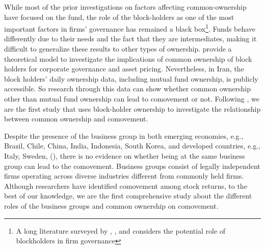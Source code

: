 While most of the prior investigations on factors affecting common-ownership have focused on the fund, the role of the block-holders as one of the most important factors in firms' governance has remained a black box\footnote{A long literature surveyed by \cite{holderness2003survey}, \cite{edmans2014blockholders}, and \cite{edmans2017blockholders} considers the potential role of blockholders in firm governance}. Funds behave differently due to their needs and the fact that they are intermediates, making it difficult to generalize these results to other types of ownership. \cite{edmans2014governance} provide a theoretical model to investigate the implications of common ownership of block holders for corporate governance and asset pricing. Nevertheless, in Iran, the block holders' daily ownership data, including mutual fund ownership, is publicly accessible. So research through this data can show whether common ownership other than mutual fund ownership can lead to comovement or not. Following \cite{AntonPolk}, we are the first study that uses block-holder ownership to investigate the relationship between common ownership and comovement.
	
	

		
Despite the presence of the business group in both emerging economies, e.g., Brazil, Chile, China, India, Indonesia, South Korea, and developed countries, e.g., Italy, Sweden, (\cite{khanna2007business}), there is no evidence on whether being at the same business group can lead to the comovement. Business groups consist of legally independent firms operating across diverse industries different from commonly held firms. Although researchers have identified comovement among stock
returns,  to the best of our knowledge, we are the first comprehensive study about the different roles of the business groups and common ownership on comovement. 




%	
%	


